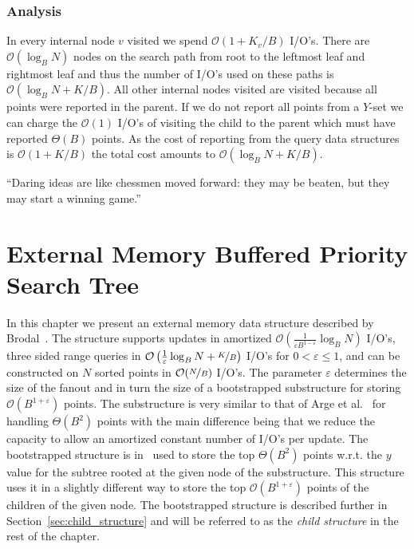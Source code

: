 \documentclass[twoside,11pt,openright]{report}
\def \epsilon {\varepsilon}
\begin{document}
\subsection{Analysis}
In every internal node $v$ visited we spend $\mathcal{O}(1+K_v/B)$ I/O's. There are $\mathcal{O}(\log_B N)$ nodes on the search path from root to the leftmost leaf and rightmost leaf and thus the number of I/O's used on these paths is $\mathcal{O}(\log_B N + K/B)$. All other internal nodes visited are visited because all points were reported in the parent. If we do not report all points from a $Y$-set we can charge the $\mathcal{O}(1)$ I/O's of visiting the child to the parent which must have reported $\Theta(B)$ points. As the cost of reporting from the query data structures is $\mathcal{O}(1+K/B)$ the total cost amounts to $\mathcal{O}(\log_B N + K/B)$.


\begin{savequote}[0.50\textwidth]
``Daring ideas are like chessmen moved forward: they may be beaten, but they may start a winning game.''
\end{savequote}
\chapter{External Memory Buffered Priority Search Tree}
\label{chp:epst}
In this chapter we present an external memory data structure described by Brodal~\cite{DBLP:journals/corr/Brodal15}. The structure supports updates in amortized $\mathcal{O}\left(\frac{1}{\epsilon B^{1-\epsilon}} \log_B N\right)$ I/O's, three sided range queries in $\mathcal{O}\left(\frac{1}{\epsilon}\log_B N + \nicefrac{K}{B}\right)$ I/O's for $0 < \epsilon \leq 1$, and can be constructed on $N$ sorted points in $\mathcal{O}(\nicefrac{N}{B})$ I/O's. The parameter $\epsilon$ determines the size of the fanout and in turn the size of a bootstrapped substructure for storing $\mathcal{O}(B^{1+\epsilon})$ points.
The substructure is very similar to that of Arge et al.~\cite[Section~3.1]{arge_vitter_2003} for handling $\Theta(B^2)$ points with the main difference being that we reduce the capacity to allow an amortized constant number of I/O's per update. The bootstrapped structure is in~\cite{arge_vitter_2003} used to store the top $\Theta(B^2)$ points w.r.t. the $y$ value for the subtree rooted at the given node of the substructure. This structure uses it in a slightly different way to store the top $\mathcal{O}(B^{1+\epsilon})$ points of the children of the given  node. The bootstrapped structure is described further in Section~\ref{sec:child_structure} and will be referred to as the \textit{child structure} in the rest of the chapter.
\end{document}
